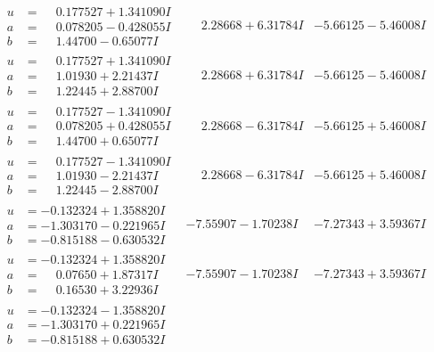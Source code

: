 \documentclass[1p]{elsarticle_modified}
\theoremstyle{definition}
\begin{document}
$$\begin{array}{c|c|c}
\begin{aligned}
u &= \phantom{-}0.177527 + 1.341090 I \\
a &= \phantom{-}0.078205 - 0.428055 I \\
b &= \phantom{-}1.44700 - 0.65077 I\end{aligned}
 & \phantom{-}2.28668 + 6.31784 I & -5.66125 - 5.46008 I \\ \hline\begin{aligned}
u &= \phantom{-}0.177527 + 1.341090 I \\
a &= \phantom{-}1.01930 + 2.21437 I \\
b &= \phantom{-}1.22445 + 2.88700 I\end{aligned}
 & \phantom{-}2.28668 + 6.31784 I & -5.66125 - 5.46008 I \\ \hline\begin{aligned}
u &= \phantom{-}0.177527 - 1.341090 I \\
a &= \phantom{-}0.078205 + 0.428055 I \\
b &= \phantom{-}1.44700 + 0.65077 I\end{aligned}
 & \phantom{-}2.28668 - 6.31784 I & -5.66125 + 5.46008 I \\ \hline\begin{aligned}
u &= \phantom{-}0.177527 - 1.341090 I \\
a &= \phantom{-}1.01930 - 2.21437 I \\
b &= \phantom{-}1.22445 - 2.88700 I\end{aligned}
 & \phantom{-}2.28668 - 6.31784 I & -5.66125 + 5.46008 I \\ \hline\begin{aligned}
u &= -0.132324 + 1.358820 I \\
a &= -1.303170 - 0.221965 I \\
b &= -0.815188 - 0.630532 I\end{aligned}
 & -7.55907 - 1.70238 I & -7.27343 + 3.59367 I \\ \hline\begin{aligned}
u &= -0.132324 + 1.358820 I \\
a &= \phantom{-}0.07650 + 1.87317 I \\
b &= \phantom{-}0.16530 + 3.22936 I\end{aligned}
 & -7.55907 - 1.70238 I & -7.27343 + 3.59367 I \\ \hline\begin{aligned}
u &= -0.132324 - 1.358820 I \\
a &= -1.303170 + 0.221965 I \\
b &= -0.815188 + 0.630532 I\end{aligned}

\end{array}$$
\end{document}
